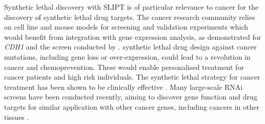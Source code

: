 Synthetic lethal discovery with \gls{SLIPT} is of particular relevance to cancer for the discovery \textcolor{black}{of} \gls{synthetic lethal} drug targets. The cancer research community relies on cell line and mouse models for screening and validation experiments \citep{Fece2015} which would benefit from integration with \gls{gene expression} analysis, as demonstrated for \textit{CDH1} and the screen conducted by \citet{Telford2015}. \Gls{synthetic lethal} drug design against cancer \glspl{mutation}, including gene loss or over-expression, could lead to a revolution in cancer  and \gls{chemoprevention}. These  would enable personalised treatment for cancer patients and high risk individuals.  The \gls{synthetic lethal} strategy for cancer treatment has been shown to be clinically effective \citep{McLachlan2016,Farmer2005, Bryant2005}. Many large-scale \gls{RNAi} screens have been conducted recently, aiming to discover gene function and drug targets for similar application with other cancer genes, including cancers in other tissues \citep{Fece2015}.



